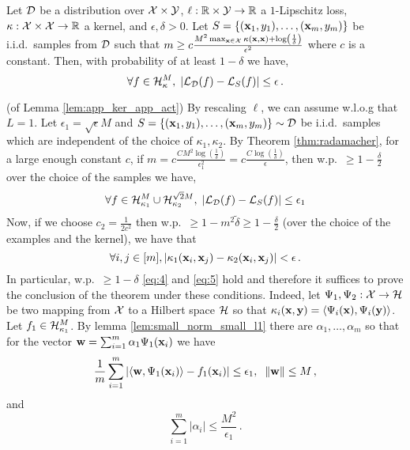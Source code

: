 \begin{theorem} \label{thm:radamacher}
Let ${\cal D}$ be a distribution over ${\cal X}\times{\cal Y}$, $\ell:{\mathbb R}\times{\cal Y}\to{\mathbb R}$
a $1$-Lipschitz loss, $\kappa:{\cal X}\times{\cal X}\to {\mathbb R}$ a kernel, and
$\epsilon,\delta>0$. Let $S=\{({\mathbf x}_1,y_1),\ldots,({\mathbf x}_m,y_m)\}$ be i.i.d.\
samples from ${\cal D}$ such that
$m \ge c
	\frac{M^2 \max_{{\mathbf x}\in{\cal X}}\kappa({\mathbf x},{\mathbf x})+\log\left(\frac{1}{\delta}\right)}
	{\epsilon^2}$ where $c$ is a constant.
Then, with probability of at least $1-\delta$ we have,
\[
\forall f\in {\cal H}^M_{\kappa},\; |{\cal L}_{\cal D}(f) - {\cal L}_S(f)| \le \epsilon \,.
\]
\end{theorem}
\proof (of Lemma \ref{lem:app_ker_app_act})
By rescaling $\ell$, we can assume w.l.o.g that $L=1$.  Let
$\epsilon_1=\sqrt{\epsilon}M$ and $S=\{({\mathbf x}_1,y_1),\ldots,({\mathbf x}_m,y_m)\}\sim{\cal D}$
be i.i.d.\ samples which are independent of the choice of
$\kappa_1,\kappa_2$. By Theorem \ref{thm:radamacher}, for a large enough
constant $c$, if $m=c \frac{C  M^2 \log\left(\frac{1}{\delta}\right)}{\epsilon_1^2}=c \frac{C\log\left(\frac{1}{\delta}\right)}{\epsilon}$,
then w.p.\ $\ge 1-\frac{\delta}{2}$ over the choice of the samples we have,
\begin{equation}\label{eq:4}
\forall f\in {\cal H}_{\kappa_1}^{M}\cup{\cal H}_{\kappa_2}^{\sqrt{2}M} ,\;|{\cal L}_{\cal D}(f) - {\cal L}_{S}(f)|\le \epsilon_1
\end{equation}
Now, if we choose $c_2=\frac{1}{2c^2}$ then w.p.\ $\ge 1-m^2\tilde{\delta} \ge 1-\frac{\delta}{2}$
(over the choice of the examples and the kernel), we have that
\begin{equation}\label{eq:5}
\forall i,j\in [m], |\kappa_1({\mathbf x}_i,{\mathbf x}_j)-\kappa_2({\mathbf x}_i,{\mathbf x}_j)|< \epsilon \,.
\end{equation}
In particular, w.p.\ $\ge 1-\delta$ \eqref{eq:4} and \eqref{eq:5} hold and
therefore it suffices to prove the conclusion of the theorem under these
conditions. Indeed, let $\Psi_1,\Psi_2:{\cal X}\to {\cal H}$ be two mapping from ${\cal X}$ to
a Hilbert space ${\cal H}$ so that $\kappa_i({\mathbf x},{\mathbf y})=\langle \Psi_i({\mathbf x}),\Psi_i({\mathbf y}) \rangle$.
Let $f_1\in{\cal H}^M_{\kappa_1}$. By lemma \ref{lem:small_norm_small_l1} there are
$\alpha_1,\ldots,\alpha_m$ so that for the vector
${\mathbf w}=\sum_{i=1}^m\alpha_1\Psi_1({\mathbf x}_i)$ we have
\begin{equation}\label{eq:6}
\frac{1}{m}\sum_{i=1}^m|\langle {\mathbf w},\Psi_1({\mathbf x}_i) \rangle-f_1({\mathbf x}_i)|\le
	\epsilon_1,\;\;\|{\mathbf w}\|\le M \,,
\end{equation}
and
\begin{equation}\label{eq:7}
\sum_{i=1}^m|\alpha_i|\le \frac{M^2}{\epsilon_1} \,.
\end{equation}
